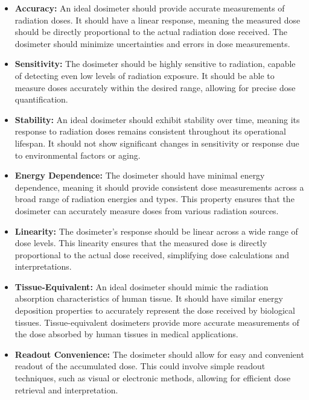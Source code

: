 \documentclass[../../Report.tex]{subfiles}
\begin{document}
        \begin{itemize}
            \item \textbf{Accuracy: } An ideal dosimeter should provide accurate measurements of radiation 
            doses. It should have a linear response, meaning the measured dose should be directly proportional 
            to the actual radiation dose received. The dosimeter should minimize uncertainties and errors in 
            dose measurements.

            \item \textbf{Sensitivity: } The dosimeter should be highly sensitive to radiation, capable of 
            detecting even low levels of radiation exposure. It should be able to measure doses accurately 
            within the desired range, allowing for precise dose quantification.

            \item \textbf{Stability: } An ideal dosimeter should exhibit stability over time, meaning its 
            response to radiation doses remains consistent throughout its operational lifespan. It should not 
            show significant changes in sensitivity or response due to environmental factors or aging.

            \item \textbf{Energy Dependence: } The dosimeter should have minimal energy dependence, meaning it 
            should provide consistent dose measurements across a broad range of radiation energies and types. 
            This property ensures that the dosimeter can accurately measure doses from various radiation sources.

            \item \textbf{Linearity: } The dosimeter's response should be linear across a wide range of dose 
            levels. This linearity ensures that the measured dose is directly proportional to the actual dose 
            received, simplifying dose calculations and interpretations.

            \item \textbf{Tissue-Equivalent: } An ideal dosimeter should mimic the radiation absorption 
            characteristics of human tissue. It should have similar energy deposition properties to accurately 
            represent the dose received by biological tissues. Tissue-equivalent dosimeters provide more 
            accurate measurements of the dose absorbed by human tissues in medical applications.

            \item \textbf{Readout Convenience: } The dosimeter should allow for easy and convenient readout 
            of the accumulated dose. This could involve simple readout techniques, such as visual or 
            electronic methods, allowing for efficient dose retrieval and interpretation.


\end{itemize}
\end{document}
